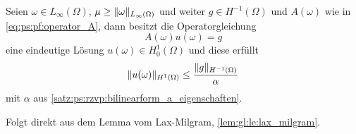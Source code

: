 \begin{Satz}
\label{satz:ps:rg:lax_milgram_anwendung}
    Seien $\omega \in L_{\infty}(\Omega)$, $\mu \geq \lVert\omega\rVert_{L_{\infty}(\Omega)}$ und weiter $g \in H^{-1}(\Omega)$ und $A(\omega)$ wie in \cref{eq:ps:pf:operator_A}, dann besitzt die Operatorgleichung
    \begin{equation}
        A(\omega) u(\omega) = g
    \end{equation}
    eine eindeutige Lösung $u(\omega) \in H^{1}_{0}(\Omega)$ und diese erfüllt
    \begin{equation}
        \lVert u(\omega)\rVert_{H^{1}(\Omega)} \leq \frac{\lVert g\rVert_{H^{-1}(\Omega)}}{\alpha}
    \end{equation}
    mit $\alpha$ aus \cref{satz:ps:rzvp:bilinearform_a_eigenschaften}.

    \begin{Beweis}
        Folgt direkt aus dem Lemma vom Lax-Milgram, \cref{lem:gl:le:lax_milgram}.
    \end{Beweis}
\end{Satz}

